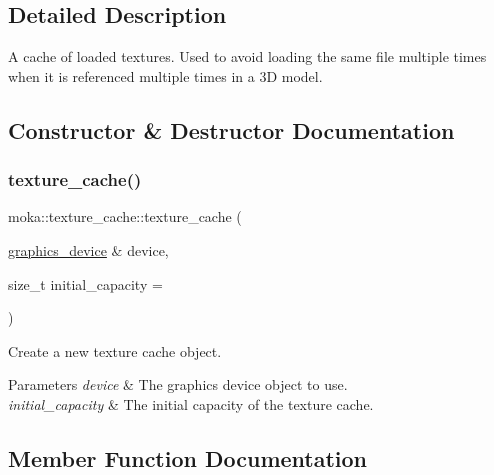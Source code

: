 \subsection{Detailed Description}
A cache of loaded textures. Used to avoid loading the same file multiple times when it is referenced multiple times in a 3D model. 

\subsection{Constructor \& Destructor Documentation}
\mbox{\label{classmoka_1_1texture__cache_a3f3e8968e3b9562371f11bc3a525a1c6}} 
\subsubsection{\texorpdfstring{texture\_cache()}{texture\_cache()}}
{\footnotesize\ttfamily moka\+::texture\+\_\+cache\+::texture\+\_\+cache (\begin{DoxyParamCaption}\item[{\mbox{\hyperlink{classmoka_1_1graphics__device}{graphics\+\_\+device}} \&}]{device,  }\item[{size\+\_\+t}]{initial\+\_\+capacity = {} }\end{DoxyParamCaption})\hspace{0.3cm}{\ttfamily [explicit]}}



Create a new texture cache object. 


\begin{DoxyParams}{Parameters}
{\em device} & The graphics device object to use. \\
\hline
{\em initial\+\_\+capacity} & The initial capacity of the texture cache. \\
\hline
\end{DoxyParams}


\subsection{Member Function Documentation}
\mbox{\label{classmoka_1_1texture__cache_a42a0d37e28d1b7141f9343a9703a5546}} 
